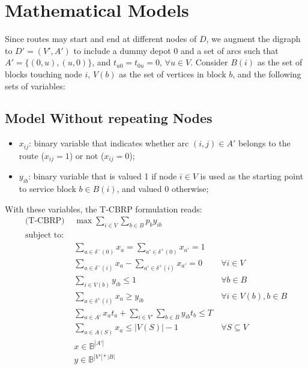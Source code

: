 \chapter{Mathematical Models} \label{chapter:models}

Since routes may start and end at different nodes of $D$, we augment the digraph to $D' = (V', A')$  to include a dummy depot $0$ and a set of arcs such that $A' = \{(0, u), (u, 0)\}$, and $t_{u0} = t_{0u} = 0$, $\forall u \in V$. Consider $B(i)$ as the set of blocks touching node $i$, $V(b)$ as the set of vertices in block $b$, and the following sets of variables:

 \section{Model Without repeating Nodes}
 
\begin{itemize}
  \item $x_{ij}$: binary variable that indicates whether arc $(i, j) \in
    A'$ belongs to the route ($x_{ij} = 1$) or not ($x_{ij} = 0$);
  \item $y_{ib}$: binary variable that is valued 1 if node $i \in V$ is
    used as the starting point to service block $b \in B(i)$, and valued 0 otherwise; 
\end{itemize}

With these variables, the T-CBRP formulation reads:
\allowdisplaybreaks
\begin{align}
  \text{(T-CBRP) } & \max \sum_{i \in V} \sum_{b \in B} p_b y_{ib} & \label{eq:of}\\
  \nonumber \text{subject to:} & & \\
       & \sum_{a \in \delta^{-}(0)} x_{a} = \sum_{a' \in \delta^{+}(0)} x_{a'} = 1 & \label{eq:s-t-all} \\
       & \sum_{a \in \delta^{-}(i)} x_{a} - \sum_{a' \in \delta^{+}(i)} x_{a'} = 0 & \ \forall i \in V \label{eq:flow-conservation} \\
       & \sum_{i \in V(b)} y_{ib} \leq 1 & \ \forall b \in B \label{eq:max-attend} \\
       & \sum_{a \in \delta^{+}(i)} x_{a} \geq y_{ib} & \ \forall i \in V(b), b \in B \label{eq:in-path} \\
       & \sum_{a \in A'} x_{a}t_{a} + \sum_{i \in V'} \sum_{b \in B} y_{ib}t_{b} \leq T & \label{eq:max-time} \\
       & \sum_{a \in A(S)} x_{a} \leq |V(S)| - 1 & \ \forall S \subseteq V \label{eq:circuit-subtour-elimination} \\
       & x \in \mathbb{B}^{|A'|} & \label{eq:dom-x} \\
       & y \in \mathbb{B}^{|V'| * |B|} & \label{eq:dom-y}
\end{align}

